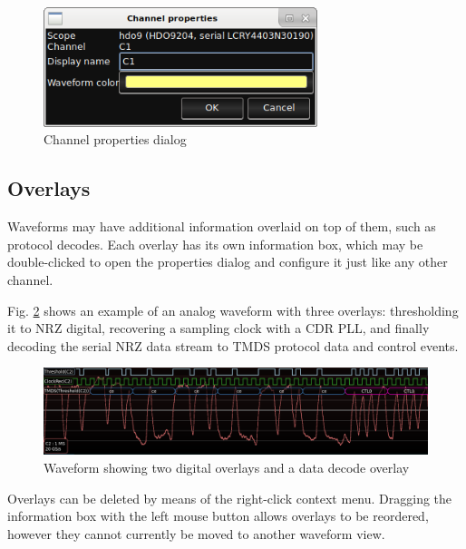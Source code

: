 \begin{figure}[H]
\centering
\includegraphics[width=8cm]{images/channel-properties.png}
\caption{Channel properties dialog}
\label{channel-properties}
\end{figure}


\subsection{Overlays}

Waveforms may have additional information overlaid on top of them, such as protocol decodes. Each overlay has its own
information box, which may be double-clicked to open the properties dialog and configure it just like any other
channel.

Fig. \ref{overlays} shows
an example of an analog waveform with three overlays: thresholding it to NRZ digital, recovering a sampling
clock with a CDR PLL, and finally decoding the serial NRZ data stream to TMDS protocol data and control events.

\begin{figure}[H]
\centering
\includegraphics[width=14cm]{images/overlays.png}
\caption{Waveform showing two digital overlays and a data decode overlay}
\label{overlays}
\end{figure}

Overlays can be deleted by means of the right-click context menu. Dragging the information box with the left mouse
button allows overlays to be reordered, however they cannot currently be moved to another waveform view.
